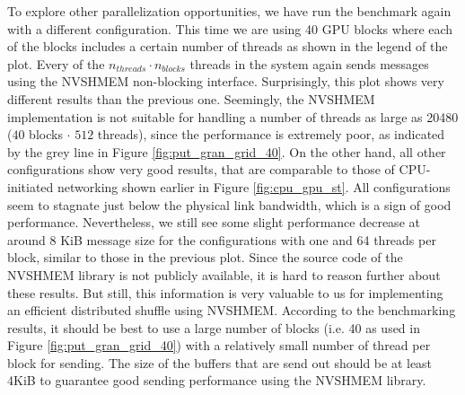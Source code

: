 To explore other parallelization opportunities, we have run the benchmark again with a different configuration.
This time we are using 40 GPU blocks where each of the blocks includes a certain number of threads as shown in the legend of the plot.
Every of the $n_{threads} \cdot n_{blocks}$ threads in the system again sends messages using the NVSHMEM non-blocking interface.
Surprisingly, this plot shows very different results than the previous one.
Seemingly, the NVSHMEM implementation is not suitable for handling a number of threads as large as 20480 ($40$ blocks $\cdot$ $512$ threads), since the performance is extremely poor, as indicated by the grey line in Figure \ref{fig:put_gran_grid_40}.
On the other hand, all other configurations show very good results, that are comparable to those of CPU-initiated networking shown earlier in Figure \ref{fig:cpu_gpu_st}.
All configurations seem to stagnate just below the physical link bandwidth, which is a sign of good performance.
Nevertheless, we still see some slight performance decrease at around 8 KiB message size for the configurations with one and 64 threads per block, similar to those in the previous plot.
Since the source code of the NVSHMEM library is not publicly available, it is hard to reason further about these results.
But still, this information is very valuable to us for implementing an efficient distributed shuffle using NVSHMEM.
According to the benchmarking results, it should be best to use a large number of blocks (i.e. 40 as used in Figure \ref{fig:put_gran_grid_40}) with a relatively small number of thread per block for sending.
The size of the buffers that are send out should be at least 4KiB to guarantee good sending performance  using the NVSHMEM library.
